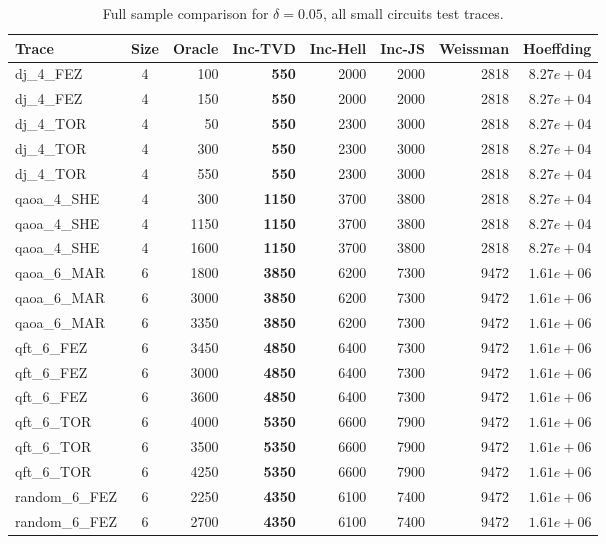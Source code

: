 \begin{table}[ht!]
\centering
\footnotesize
\setlength{\tabcolsep}{3pt}
\renewcommand{\arraystretch}{1.05}
\caption{Full sample comparison for $\delta = 0.05$, all small circuits test traces.}
\label{tab:appendix-sota-d005-s}
\begin{tabular}{l c r r r r r r}
\toprule
Trace & Size & Oracle & Inc-TVD & Inc-Hell & Inc-JS & Weissman & Hoeffding \\
\midrule
dj\_4\_FEZ & 4 & 100 & \textbf{550} & 2000 & 2000 & 2818 & $8.27e+04$ \\
dj\_4\_FEZ & 4 & 150 & \textbf{550} & 2000 & 2000 & 2818 & $8.27e+04$ \\
dj\_4\_TOR & 4 & 50 & \textbf{550} & 2300 & 3000 & 2818 & $8.27e+04$ \\
dj\_4\_TOR & 4 & 300 & \textbf{550} & 2300 & 3000 & 2818 & $8.27e+04$ \\
dj\_4\_TOR & 4 & 550 & \textbf{550} & 2300 & 3000 & 2818 & $8.27e+04$ \\
qaoa\_4\_SHE & 4 & 300 & \textbf{1150} & 3700 & 3800 & 2818 & $8.27e+04$ \\
qaoa\_4\_SHE & 4 & 1150 & \textbf{1150} & 3700 & 3800 & 2818 & $8.27e+04$ \\
qaoa\_4\_SHE & 4 & 1600 & \textbf{1150} & 3700 & 3800 & 2818 & $8.27e+04$ \\
qaoa\_6\_MAR & 6 & 1800 & \textbf{3850} & 6200 & 7300 & 9472 & $1.61e+06$ \\
qaoa\_6\_MAR & 6 & 3000 & \textbf{3850} & 6200 & 7300 & 9472 & $1.61e+06$ \\
qaoa\_6\_MAR & 6 & 3350 & \textbf{3850} & 6200 & 7300 & 9472 & $1.61e+06$ \\
qft\_6\_FEZ & 6 & 3450 & \textbf{4850} & 6400 & 7300 & 9472 & $1.61e+06$ \\
qft\_6\_FEZ & 6 & 3000 & \textbf{4850} & 6400 & 7300 & 9472 & $1.61e+06$ \\
qft\_6\_FEZ & 6 & 3600 & \textbf{4850} & 6400 & 7300 & 9472 & $1.61e+06$ \\
qft\_6\_TOR & 6 & 4000 & \textbf{5350} & 6600 & 7900 & 9472 & $1.61e+06$ \\
qft\_6\_TOR & 6 & 3500 & \textbf{5350} & 6600 & 7900 & 9472 & $1.61e+06$ \\
qft\_6\_TOR & 6 & 4250 & \textbf{5350} & 6600 & 7900 & 9472 & $1.61e+06$ \\
random\_6\_FEZ & 6 & 2250 & \textbf{4350} & 6100 & 7400 & 9472 & $1.61e+06$ \\
random\_6\_FEZ & 6 & 2700 & \textbf{4350} & 6100 & 7400 & 9472 & $1.61e+06$ \\

\end{tabular}
\end{table}
